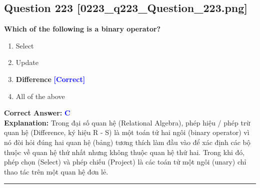 \documentclass[11pt,a4paper]{article}
\begin{document}
\begin{minipage}{\textwidth}
\subsection*{Question 223 \quad \footnotesize{[0223\_q223\_Question\_223.png]}}
\noindent \textbf{Which of the following is a binary operator?}

\begin{enumerate}[label=\Alph*.]
    \item Select
    \item Update
    \item \textbf{Difference} \hfill \textcolor{blue}{\textbf{[Correct]}}
    \item All of the above
\end{enumerate}

\noindent \textbf{Correct Answer:} \textcolor{blue}{\textbf{C}} \\[2pt]
\noindent \textbf{Explanation:} Trong đại số quan hệ (Relational Algebra), phép hiệu / phép trừ quan hệ (Difference, ký hiệu R - S) là một toán tử hai ngôi (binary operator) vì nó đòi hỏi đúng hai quan hệ (bảng) tương thích làm đầu vào để xác định các bộ thuộc về quan hệ thứ nhất nhưng không thuộc quan hệ thứ hai. Trong khi đó, phép chọn (Select) và phép chiếu (Project) là các toán tử một ngôi (unary) chỉ thao tác trên một quan hệ đơn lẻ.

\par\vspace{0.3cm}
\hrule
\vspace{0.3cm}
\end{minipage}
\end{document}
